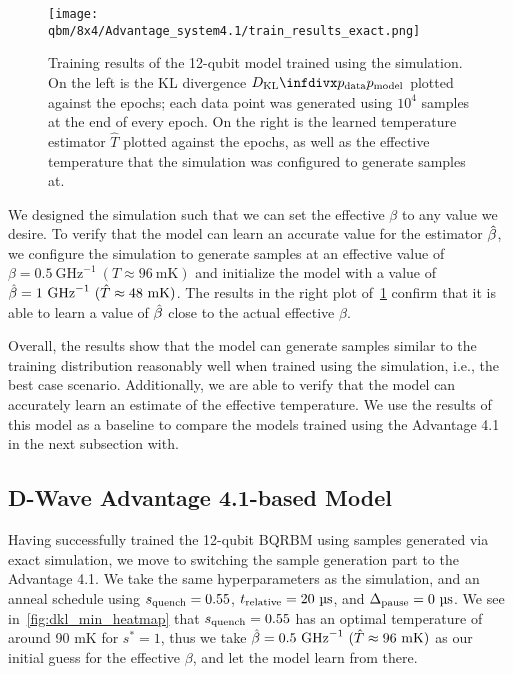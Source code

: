 \begin{figure}[!htb]
    \begin{center}
        \texttt{[image: qbm/8x4/Advantage\_system4.1/train\_results\_exact.png]}
    \end{center}
    \caption{
        Training results of the 12-qubit model trained using the simulation.
        On the left is the KL divergence \( \DKL{\pdata}{\pmodel} \) plotted against the epochs; each data point was generated using \( 10^4 \) samples at the end of every epoch.
        On the right is the learned temperature estimator \( \hat{T} \) plotted against the epochs, as well as the effective temperature that the simulation was configured to generate samples at.
    }
    \label{fig:train_results_exact}
\end{figure}

We designed the simulation such that we can set the effective \( \beta \) to any value we desire.
To verify that the model can learn an accurate value for the estimator \( \hat{\beta} \), we configure the simulation to generate samples at an effective value of \( \beta = 0.5 \ \si{\giga\hertz}^{-1} \ (T \approx 96 \ \si{\milli\kelvin}) \) and initialize the model with a value of \( \hat{\beta} = 1 \ \si{\giga\hertz}^{-1} \ (\hat{T} \approx 48 \ \si{\milli\kelvin}) \).
The results in the right plot of~\cref{fig:train_results_exact} confirm that it is able to learn a value of \( \hat{\beta} \) close to the actual effective \( \beta \).

Overall, the results show that the model can generate samples similar to the training distribution reasonably well when trained using the simulation, i.e., the best case scenario.
Additionally, we are able to verify that the model can accurately learn an estimate of the effective temperature.
We use the results of this model as a baseline to compare the models trained using the Advantage 4.1 in the next subsection with.

\subsection{D-Wave Advantage 4.1-based Model}
Having successfully trained the 12-qubit BQRBM using samples generated via exact simulation, we move to switching the sample generation part to the Advantage 4.1.
We take the same hyperparameters as the simulation, and an anneal schedule using \( s_{\text{quench}} = 0.55 \), \( t_{\text{relative}} = 20 \ \si{\micro\second} \), and \( \Delta_{\text{pause}} = 0 \ \si{\micro\second} \).
We see in~\cref{fig:dkl_min_heatmap} that \( s_{\text{quench}} = 0.55 \) has an optimal temperature of around 90 \si{\milli\kelvin} for \( s^* = 1 \), thus we take \( \betahat = 0.5 \ \si{\giga\hertz}^{-1} \ (\hat{T} \approx 96 \ \si{\milli\kelvin}) \) as our initial guess for the effective \( \beta \), and let the model learn from there.


